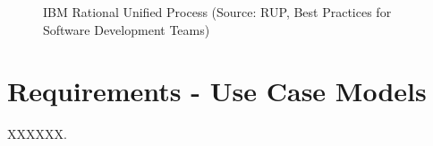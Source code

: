 \documentclass[12pt]{article} %
\begin{document}
		\begin{figure}[H] %
			\caption{IBM Rational Unified Process (Source: RUP, Best Practices for Software Development Teams)}
			\label{fig:speciation}
		\end{figure}
		
		
	
	
	
	
	
	
	
	

	
    \section{Requirements - Use Case Models}
    
    	XXXXXX.\\
    	
\end{document}
